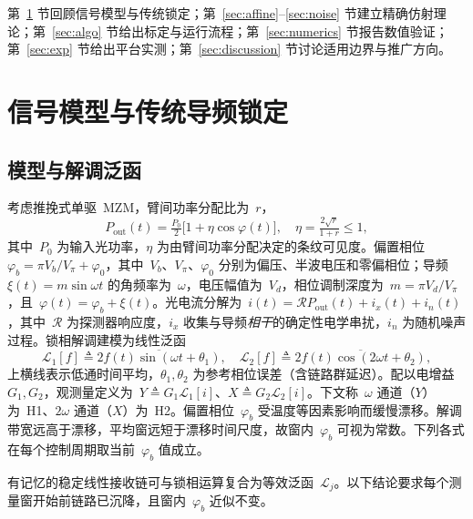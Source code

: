 \documentclass[journal]{IEEEtran}
\theoremstyle{plain}
\theoremstyle{remark}
\newcommand{\Lc}{\mathcal{L}}
\begin{document}
第~\ref{sec:model} 节回顾信号模型与传统锁定；第~\ref{sec:affine}--\ref{sec:noise} 节建立精确仿射理论；第~\ref{sec:algo} 节给出标定与运行流程；第~\ref{sec:numerics} 节报告数值验证；第~\ref{sec:exp} 节给出平台实测；第~\ref{sec:discussion} 节讨论适用边界与推广方向。

\section{信号模型与传统导频锁定}
\label{sec:model}

\subsection{模型与解调泛函}
考虑推挽式单驱~MZM，臂间功率分配比为~$r$，
\begin{equation}
P_{\mathrm{out}}(t)=\tfrac{P_0}{2}\bigl[1+\eta\cos\varphi(t)\bigr],\quad
\eta=\tfrac{2\sqrt r}{1+r}\le 1,
\label{eq:mzm}
\end{equation}
其中~$P_0$ 为输入光功率，$\eta$ 为由臂间功率分配决定的条纹可见度。偏置相位~$\varphi_b=\pi V_b/V_\pi+\varphi_0$，其中~$V_b$、$V_\pi$、$\varphi_0$ 分别为偏压、半波电压和零偏相位；导频~$\xi(t)=m\sin\omega t$ 的角频率为~$\omega$，电压幅值为~$V_d$，相位调制深度为~$m=\pi V_d/V_\pi$，且~$\varphi(t)=\varphi_b+\xi(t)$。光电流分解为~$i(t)=\mathcal{R}P_{\mathrm{out}}(t)+i_x(t)+i_n(t)$，其中~$\mathcal{R}$ 为探测器响应度，$i_x$ 收集与导频\emph{相干}的确定性电学串扰，$i_n$ 为随机噪声过程。锁相解调建模为线性泛函
\begin{equation}
\Lc_1[f]\!\triangleq\!\overline{2f(t)\sin(\omega t{+}\theta_1)},\quad
\Lc_2[f]\!\triangleq\!\overline{2f(t)\cos(2\omega t{+}\theta_2)},
\label{eq:lockin}
\end{equation}
上横线表示低通时间平均，$\theta_1,\theta_2$ 为参考相位误差（含链路群延迟）。配以电增益~$G_1,G_2$，观测量定义为~$Y\triangleq G_1\Lc_1[i]$、$X\triangleq G_2\Lc_2[i]$。下文称~$\omega$ 通道（$Y$）为~H1、$2\omega$ 通道（$X$）为~H2。偏置相位~$\varphi_b$ 受温度等因素影响而缓慢漂移。解调带宽远高于漂移，平均窗远短于漂移时间尺度，故窗内~$\varphi_b$ 可视为常数。下列各式在每个控制周期取当前~$\varphi_b$ 值成立。

有记忆的稳定线性接收链可与锁相运算复合为等效泛函~$\Lc_j$。以下结论要求每个测量窗开始前链路已沉降，且窗内~$\varphi_b$ 近似不变。
\end{document}
